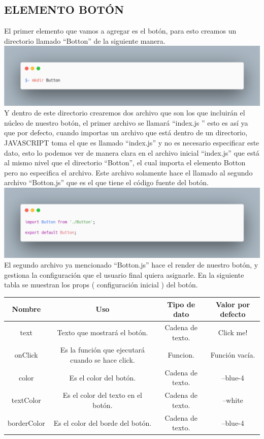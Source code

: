\subsection{ELEMENTO BOTÓN}
El primer elemento que vamos a agregar es el botón, para esto creamos un directorio llamado “Botton” de la siguiente manera.
\newline
\newline
\includegraphics[width=1\textwidth]{./Imagenes/carbon-3.png}
\newline
Y dentro de este directorio crearemos dos archivo que son los que incluirán el núcleo de nuestro botón, el primer archivo se llamará “index.js ” esto es así ya que por defecto, cuando importas un archivo que está dentro de un directorio, JAVASCRIPT toma el que es llamado “index.js” y no es necesario especificar este dato, esto lo podemos ver de manera clara en el archivo inicial “index.js” que está al mismo nivel que el directorio “Botton”, el cual importa el elemento Botton pero no especifica el archivo. Este archivo solamente hace el llamado al segundo archivo “Botton.js” que es el que tiene el código fuente del botón. 
\newline
\includegraphics[width=1\textwidth]{./Imagenes/carbon-5.png}
\newline
El segundo archivo ya mencionado “Botton.js”  hace el render de nuestro botón, y gestiona la configuración que el usuario final quiera asignarle.
En la siguiente tabla se muestran los props ( configuración inicial  ) del botón.
\begin{center}
 \begin{tabular}{|c|c|c|c|} 
 \hline
Nombre & Uso &  Tipo de dato & Valor por defecto\\ [0.5ex] 
 \hline\hline
text & Texto que mostrará el botón.  &  Cadena de texto. & Click me! \\  [2.5ex] 
 \hline
onClick & Es la función que ejecutará cuando se hace click. & Funcion. & Función vacía. \\[2.5ex] 
 \hline
color &  Es el color del botón. & Cadena de texto. & --blue-4 \\[3.5ex] 
 \hline
 textColor & Es el color del texto en el botón. &  Cadena de texto. & --white \\[2.5ex] 
 \hline
borderColor & Es el color del borde del botón. & Cadena de texto. & --blue-4 \\ [2.5ex] 
 \hline
\end{tabular}
\end{center}
